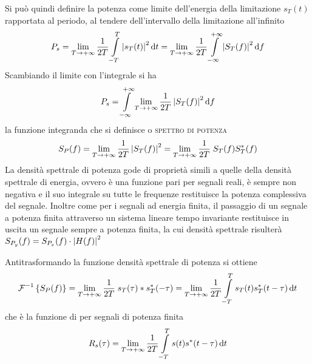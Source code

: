Si può quindi definire la potenza come limite dell'energia della limitazione $s_T(t)$ rapportata al periodo, al tendere dell'intervallo della limitazione all'infinito
\[P_s=\lim\limits_{T\to+\infty}{\frac{1}{2T}\int\limits_{-T}^{T}{\left|{s_T(t)}\right|^2}{\,\mathop{}\!\mathrm{d}{t}}}=\lim\limits_{T\to+\infty}{\frac{1}{2T}\int\limits_{-\infty}^{+\infty}{\left|{S_T(f)}\right|^2}{\,\mathop{}\!\mathrm{d}{f}}}\]
Scambiando il limite con l'integrale si ha
\[P_s=\int\limits_{-\infty}^{+\infty}{\lim\limits_{T\to+\infty}\frac{1}{2T}\left|{S_T(f)}\right|^2}{\,\mathop{}\!\mathrm{d}{f}}\]
la funzione integranda che si definisce  o \textsc{spettro di potenza}
\begin{equation}
S_P(f)=\lim\limits_{T\to+\infty}{\frac{1}{2T}\left|{S_T(f)}\right|^2}=\lim\limits_{T\to+\infty}{\frac{1}{2T}\;S_T(f)S_{T}^\ast(f)}
\end{equation}
La densità spettrale di potenza gode di proprietà simili a quelle della densità spettrale di energia, ovvero è una funzione pari per segnali reali, è sempre non negativa e il suo integrale su tutte le frequenze restituisce la potenza complessiva del segnale.
Inoltre come per i segnali ad energia finita, il passaggio di un segnale a potenza finita attraverso un sistema lineare tempo invariante restituisce in uscita un segnale sempre a potenza finita, la cui densità spettrale risulterà $S_{P_y}(f)=S_{P_x}(f)\cdot\left|{H(f)}\right|^2$

Antitrasformando la funzione densità spettrale di potenza si ottiene
\[\operatorname{\mathcal{F}}^{-1}\left\lbrace{S_P(f)}\right\rbrace=\lim\limits_{T\to+\infty}{\frac{1}{2T}\;s_T(\tau)\ast s_{T}^\ast(-\tau)}=\lim\limits_{T\to+\infty}{\frac{1}{2T}\int\limits_{-T}^{T}{s_T(t)s_{T}^\ast(t-\tau)}{\,\mathop{}\!\mathrm{d}{t}}}\]
che è la funzione di  per segnali di potenza finita
\begin{equation}
R_s(\tau)=\lim\limits_{T\to+\infty}{\frac{1}{2T}\int\limits_{-T}^{T}{s(t){s}^\ast(t-\tau)}{\,\mathop{}\!\mathrm{d}{t}}}
\end{equation}
